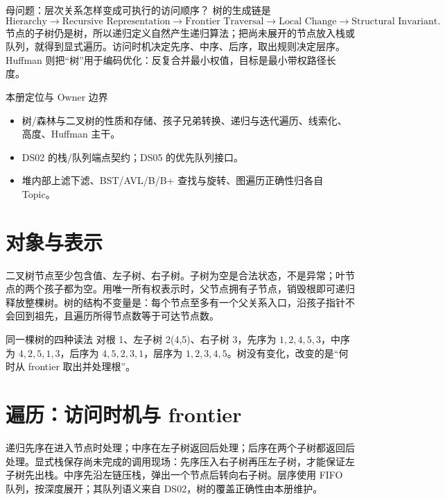 \documentclass[UTF8,fontset=none,11pt,a4paper]{ctexart}
\begin{document}

\begin{corebox}{母问题：层次关系怎样变成可执行的访问顺序？}
树的生成链是
\[
\text{Hierarchy}\to\text{Recursive Representation}\to\text{Frontier Traversal}\to\text{Local Change}\to\text{Structural Invariant}.
\]
节点的子树仍是树，所以递归定义自然产生递归算法；把尚未展开的节点放入栈或队列，就得到显式遍历。访问时机决定先序、中序、后序，取出规则决定层序。Huffman 则把“树”用于编码优化：反复合并最小权值，目标是最小带权路径长度。
\end{corebox}
\begin{methodbox}{本册定位与 Owner 边界}
\begin{itemize}
\item {}树/森林与二叉树的性质和存储、孩子兄弟转换、递归与迭代遍历、线索化、高度、Huffman 主干。
\item {}DS02 的栈/队列端点契约；DS05 的优先队列接口。
\item {}堆内部上滤下滤、BST/AVL/B/B+ 查找与旋转、图遍历正确性归各自 Topic。
\end{itemize}
\end{methodbox}
\tableofcontents\newpage

\section{对象与表示}
二叉树节点至少包含值、左子树、右子树。子树为空是合法状态，不是异常；叶节点的两个孩子都为空。用唯一所有权表示时，父节点拥有子节点，销毁根即可递归释放整棵树。树的结构不变量是：每个节点至多有一个父关系入口，沿孩子指针不会回到祖先，且遍历所得节点数等于可达节点数。

\begin{examplebox}{同一棵树的四种读法}
对根 1、左子树 2(4,5)、右子树 3，先序为 $1,2,4,5,3$，中序为 $4,2,5,1,3$，后序为 $4,5,2,3,1$，层序为 $1,2,3,4,5$。树没有变化，改变的是“何时从 frontier 取出并处理根”。
\end{examplebox}

\section{遍历：访问时机与 frontier}
递归先序在进入节点时处理；中序在左子树返回后处理；后序在两个子树都返回后处理。显式栈保存尚未完成的调用现场：先序压入右子树再压左子树，才能保证左子树先出栈。中序先沿左链压栈，弹出一个节点后转向右子树。层序使用 FIFO 队列，按深度展开；其队列语义来自 DS02，树的覆盖正确性由本册维护。
\end{document}
